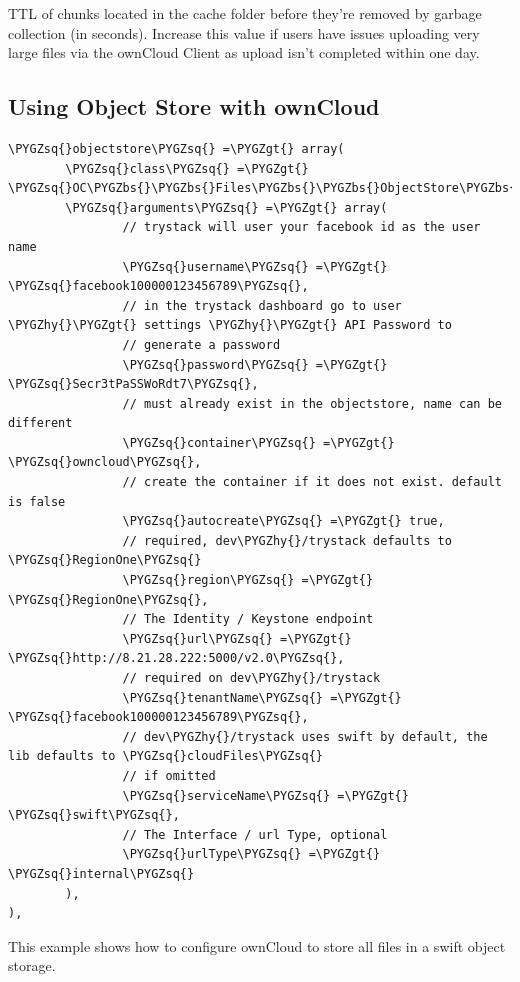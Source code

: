 \documentclass[letterpaper,10pt,english]{sphinxmanual}
\def\PYGZbs{\char`\\}
\def\PYGZgt{\char`\>}
\def\PYGZhy{\char`\-}
\def\PYGZsq{\char`\'}
\begin{document}
TTL of chunks located in the cache folder before they're removed by
garbage collection (in seconds). Increase this value if users have
issues uploading very large files via the ownCloud Client as upload isn't
completed within one day.


\subsection{Using Object Store with ownCloud}
\label{configuration_server/config_sample_php_parameters:using-object-store-with-owncloud}
\begin{Verbatim}[commandchars=\\\{\}]
\PYGZsq{}objectstore\PYGZsq{} =\PYGZgt{} array(
        \PYGZsq{}class\PYGZsq{} =\PYGZgt{} \PYGZsq{}OC\PYGZbs{}\PYGZbs{}Files\PYGZbs{}\PYGZbs{}ObjectStore\PYGZbs{}\PYGZbs{}Swift\PYGZsq{},
        \PYGZsq{}arguments\PYGZsq{} =\PYGZgt{} array(
                // trystack will user your facebook id as the user name
                \PYGZsq{}username\PYGZsq{} =\PYGZgt{} \PYGZsq{}facebook100000123456789\PYGZsq{},
                // in the trystack dashboard go to user \PYGZhy{}\PYGZgt{} settings \PYGZhy{}\PYGZgt{} API Password to
                // generate a password
                \PYGZsq{}password\PYGZsq{} =\PYGZgt{} \PYGZsq{}Secr3tPaSSWoRdt7\PYGZsq{},
                // must already exist in the objectstore, name can be different
                \PYGZsq{}container\PYGZsq{} =\PYGZgt{} \PYGZsq{}owncloud\PYGZsq{},
                // create the container if it does not exist. default is false
                \PYGZsq{}autocreate\PYGZsq{} =\PYGZgt{} true,
                // required, dev\PYGZhy{}/trystack defaults to \PYGZsq{}RegionOne\PYGZsq{}
                \PYGZsq{}region\PYGZsq{} =\PYGZgt{} \PYGZsq{}RegionOne\PYGZsq{},
                // The Identity / Keystone endpoint
                \PYGZsq{}url\PYGZsq{} =\PYGZgt{} \PYGZsq{}http://8.21.28.222:5000/v2.0\PYGZsq{},
                // required on dev\PYGZhy{}/trystack
                \PYGZsq{}tenantName\PYGZsq{} =\PYGZgt{} \PYGZsq{}facebook100000123456789\PYGZsq{},
                // dev\PYGZhy{}/trystack uses swift by default, the lib defaults to \PYGZsq{}cloudFiles\PYGZsq{}
                // if omitted
                \PYGZsq{}serviceName\PYGZsq{} =\PYGZgt{} \PYGZsq{}swift\PYGZsq{},
                // The Interface / url Type, optional
                \PYGZsq{}urlType\PYGZsq{} =\PYGZgt{} \PYGZsq{}internal\PYGZsq{}
        ),
),
\end{Verbatim}

This example shows how to configure ownCloud to store all files in a
swift object storage.
\end{document}
